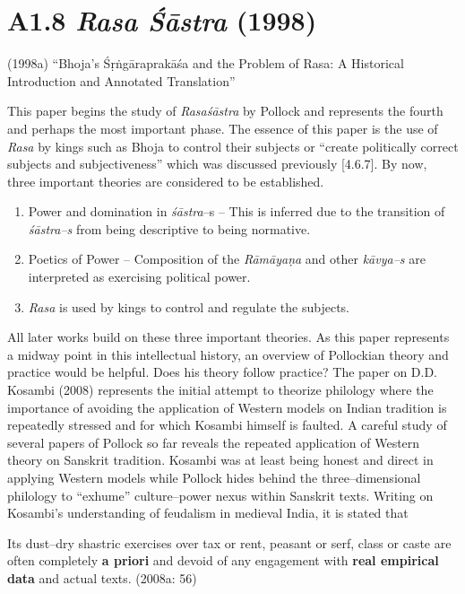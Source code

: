 \section*{A1.8 \textit{Rasa Śāstra} (1998)}

(1998a) “Bhoja's Śṛṅgāraprakāśa and the Problem of Rasa: A Historical Introduction and Annotated Translation”

This paper begins the study of \textit{Rasaśāstra} by Pollock and represents the fourth and perhaps the most important phase. The essence of this paper is the use of \textit{Rasa} by kings such as Bhoja to control their subjects or “create politically correct subjects and subjectiveness” which was discussed previously [4.6.7]. By now, three important theories are considered to be established.

\begin{enumerate}
\itemsep=0pt
\item Power and domination in \textit{śāstra}–s – This is inferred due to the transition of \textit{śāstra–s }from being descriptive to being normative.

 \item Poetics of Power – Composition of the \textit{Rāmāyaṇa} and other\textit{ kāvya–s }are interpreted as exercising political power.

 \item \textit{Rasa} is used by kings to control and regulate the subjects.

\end{enumerate}

All later works build on these three important theories. As this paper represents a midway point in this intellectual history, an overview of Pollockian theory and practice would be helpful. Does his theory follow practice? The paper on D.D. Kosambi (2008) represents the initial attempt to theorize philology where the importance of avoiding the application of Western models on Indian tradition is repeatedly stressed and for which Kosambi himself is faulted. A careful study of several papers of Pollock so far reveals the repeated application of Western theory on Sanskrit tradition. Kosambi was at least being honest and direct in applying Western models while Pollock hides behind the three–dimensional philology to “exhume” culture–power nexus within Sanskrit texts. Writing on Kosambi’s understanding of feudalism in medieval India, it is stated that

\begin{myquote}
Its dust–dry shastric exercises over tax or rent, peasant or serf, class or caste are often completely \textbf{a priori} and devoid of any engagement with \textbf{real empirical data} and actual texts. (2008a: 56)
\end{myquote}

